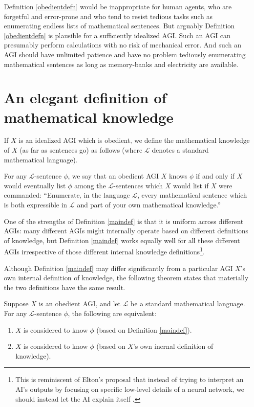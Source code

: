\documentclass[runningheads]{llncs}
\begin{document}
Definition \ref{obedientdefn} would be inappropriate
for human agents, who are forgetful and error-prone and who tend to resist
tedious tasks such as enumerating endless lists of
mathematical sentences. But arguably Definition \ref{obedientdefn} is plausible for a
sufficiently idealized AGI. Such an AGI can presumably perform calculations with
no risk of mechanical error. And such an AGI should have unlimited patience and have no
problem tediously enumerating mathematical sentences as long as memory-banks
and electricity are available.


\section{An elegant definition of mathematical knowledge}
\label{mainsection}

If $X$ is an idealized AGI which is obedient, we define the mathematical
knowledge of $X$ (as far as sentences go)
as follows (where $\mathscr L$ denotes a standard mathematical
language).

\begin{definition}
\label{maindef}
  For any $\mathscr L$-sentence $\phi$, we say that an
  obedient AGI $X$ knows $\phi$ if and only
  if $X$ would eventually list $\phi$ among the $\mathscr L$-sentences which $X$
  would list if $X$ were commanded:
  ``Enumerate, in the language $\mathscr L$, every mathematical sentence which
  is both expressible in $\mathscr L$ and part of your own mathematical knowledge.''
\end{definition}

One of the strengths of Definition \ref{maindef} is that it is uniform across
different AGIs: many different AGIs might internally operate based on different
definitions of knowledge, but Definition \ref{maindef} works equally well for
all these different AGIs irrespective of those different internal knowledge
definitions\footnote{This is reminiscent of Elton's proposal that instead of
trying to interpret an AI's outputs by focusing on specific low-level details
of a neural network, we should instead let the AI explain itself \cite{elton}.}.

Although Definition \ref{maindef} may differ significantly from a particular AGI
$X$'s own internal definition of knowledge, the following theorem states that
materially the two definitions have the same result.

\begin{theorem}
\label{sentenceequivalence}
  Suppose $X$ is an obedient AGI, and let $\mathscr L$
  be a standard mathematical language. For any $\mathscr L$-sentence $\phi$, the following
  are equivalent:
  \begin{enumerate}
    \item $X$ is
    considered to know $\phi$ (based on Definition \ref{maindef}).
    \item
    $X$ is considered to know $\phi$ (based on $X$'s own inernal definition of
    knowledge).
  \end{enumerate}
\end{theorem}
\end{document}
